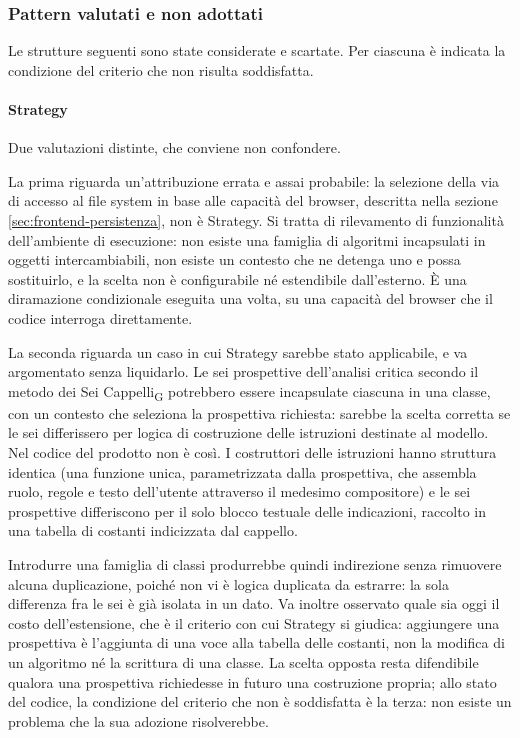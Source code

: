 \documentclass[a4paper, 10pt]{article}
\begin{document}
\subsubsection{Pattern valutati e non adottati}
\label{sec:pattern-scartati}
Le strutture seguenti sono state considerate e scartate. Per ciascuna è indicata la condizione del criterio che non risulta soddisfatta.

\paragraph{Strategy}
Due valutazioni distinte, che conviene non confondere.

La prima riguarda un'attribuzione errata e assai probabile: la selezione della via di accesso al file system in base alle capacità del browser, descritta nella sezione \ref{sec:frontend-persistenza}, non è Strategy. Si tratta di rilevamento di funzionalità dell'ambiente di esecuzione: non esiste una famiglia di algoritmi incapsulati in oggetti intercambiabili, non esiste un contesto che ne detenga uno e possa sostituirlo, e la scelta non è configurabile né estendibile dall'esterno. È una diramazione condizionale eseguita una volta, su una capacità del browser che il codice interroga direttamente.

La seconda riguarda un caso in cui Strategy sarebbe stato applicabile, e va argomentato senza liquidarlo. Le sei prospettive dell'analisi critica secondo il metodo dei Sei Cappelli\textsubscript{G} potrebbero essere incapsulate ciascuna in una classe, con un contesto che seleziona la prospettiva richiesta: sarebbe la scelta corretta se le sei differissero per logica di costruzione delle istruzioni destinate al modello. Nel codice del prodotto non è così. I costruttori delle istruzioni hanno struttura identica (una funzione unica, parametrizzata dalla prospettiva, che assembla ruolo, regole e testo dell'utente attraverso il medesimo compositore) e le sei prospettive differiscono per il solo blocco testuale delle indicazioni, raccolto in una tabella di costanti indicizzata dal cappello.

Introdurre una famiglia di classi produrrebbe quindi indirezione senza rimuovere alcuna duplicazione, poiché non vi è logica duplicata da estrarre: la sola differenza fra le sei è già isolata in un dato. Va inoltre osservato quale sia oggi il costo dell'estensione, che è il criterio con cui Strategy si giudica: aggiungere una prospettiva è l'aggiunta di una voce alla tabella delle costanti, non la modifica di un algoritmo né la scrittura di una classe. La scelta opposta resta difendibile qualora una prospettiva richiedesse in futuro una costruzione propria; allo stato del codice, la condizione del criterio che non è soddisfatta è la terza: non esiste un problema che la sua adozione risolverebbe.
\end{document}
